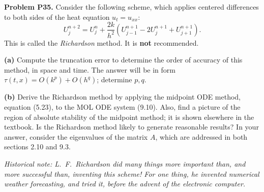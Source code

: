 \documentclass[12pt]{amsart}
\newcommand{\prob}[1]{\bigskip\noindent\textbf{#1}\quad }
\newcommand{\epart}[1]{\medskip\noindent\textbf{(#1)}\quad }
\begin{document}
\prob{Problem P35.}  Consider the following scheme, which applies centered differences to both sides of the heat equation $u_t=u_{xx}$:
    $$U_j^{n+2} = U_j^n + \frac{2k}{h^2}(U_{j-1}^{n+1} - 2U_j^{n+1} +
U_{j+1}^{n+1}).$$
This is called the \emph{Richardson} method.  It is \textbf{not} recommended.

\epart{a} Compute the truncation error to determine the order of accuracy of this method, in space and time.  The answer will be in form $\tau(t,x) = O(k^p) + O(h^q)$; determine $p,q$.

\epart{b} Derive the Richardson method by applying the midpoint ODE method, equation (5.23), to the MOL ODE system (9.10).  Also, find a picture of the region of absolute stability of the midpoint method; it is shown elsewhere in the textbook.  Is the Richardson method likely to generate reasonable results?  In your answer, consider the eigenvalues of the matrix $A$, which are addressed in both sections 2.10 and 9.3.

\medskip
\noindent \emph{Historical note: L.~F.~Richardson did many things more important than, and more successful than, inventing this scheme!  For one thing, he invented numerical weather forecasting, and tried it, before the advent of the electronic computer.}
\end{document}
